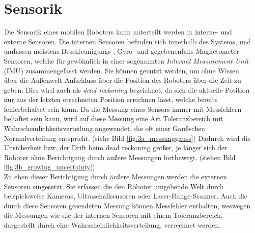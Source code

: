 \section{Sensorik}\label{sec:Sensorik}
Die Sensorik eines mobilen Roboters kann unterteilt werden in interne- und externe Sensoren. Die internen Sensoren befinden sich innerhalb des Systems, und umfassen meistens Beschleunigungs-, Gyro- und gegebenenfalls Magnetometer Sensoren, welche für gewöhnlich in einer sogenannten \textit{Internal Measurement Unit} (IMU) zusammengefasst werden. Sie können genutzt werden, um ohne Wissen über die Außenwelt Aufschluss über die Position des Roboters über die Zeit zu geben. Dies wird auch als \textit{dead reckoning} bezeichnet, da sich die aktuelle Position nur aus der letzten errechneten Position errechnen lässt, welche bereits fehlerbehaftet sein kann. Da die Messung eines Sensors immer mit Messfehlern behaftet sein kann, wird auf diese Messung eine Art Toleranzbereich mit Wahrscheinlichkeitsverteilung angewendet, die oft einer Gaußschen Normalverteilung entspricht. (siehe Bild \ref{fig:3a_messunggauss}) Dadurch wird die Unsicherheit bzw. der Drift beim dead reckoning größer, je länger sich der Roboter ohne Berichtigung durch äußere Messungen fortbewegt. (siehen Bild \ref{fig:3b_growing_uncertainty})\\
Zu eben dieser Berichtigung durch äußere Messungen werden die externen Sensoren eingesetzt. Sie erfassen die den Roboter umgebende Welt durch beispielsweise Kameras, Ultraschallsensoren oder Laser-Range-Scanner. Auch die durch diese Sensoren gesendeten Messung können Messfehler enthalten, weswegen die Messungen wie die der internen Sensoren mit einem Toleranzbereich, dargestellt durch eine Wahrscheinlichkeitsverteilung, verrechnet werden.\\


